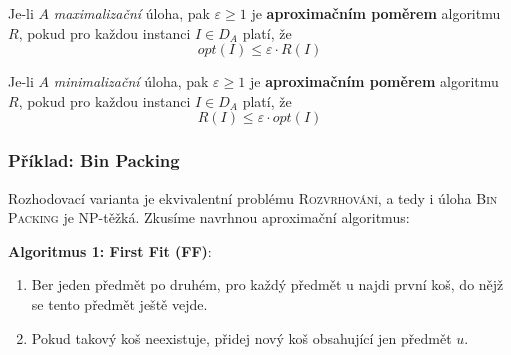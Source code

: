 \documentclass[11pt]{report} %
\numberwithin{equation}{section}
\begin{document}
Je-li $A$ \textit{maximalizační} úloha, pak $\varepsilon \geq 1$ je \textbf{aproximačním poměrem} algoritmu $R$, pokud pro každou instanci $I \in D_A$ platí, že 
$$opt(I) \leq \varepsilon \cdot R(I)$$

Je-li $A$ \textit{minimalizační} úloha, pak $\varepsilon \geq 1$ je \textbf{aproximačním poměrem} algoritmu $R$, pokud pro každou instanci $I \in D_A$ platí, že 
$$R(I) \leq \varepsilon \cdot opt(I)$$

\subsubsection{Příklad: Bin Packing}
\begin{minipage}{\textwidth}
	\bigskip
	\centering
	\bigskip
\end{minipage}

Rozhodovací varianta je ekvivalentní problému \textsc{Rozvrhování}, a tedy i úloha \textsc{Bin Packing} je NP-těžká. Zkusíme navrhnou aproximační algoritmus:

\medskip
\noindent\textbf{Algoritmus 1: First Fit (FF)}: 
\begin{enumerate}
	
	
	\item Ber jeden předmět po druhém, pro každý předmět u najdi první koš, do nějž se tento předmět ještě vejde.
	\item Pokud takový koš neexistuje, přidej nový koš obsahující jen předmět $u$.  
\end{enumerate}
\end{document}
